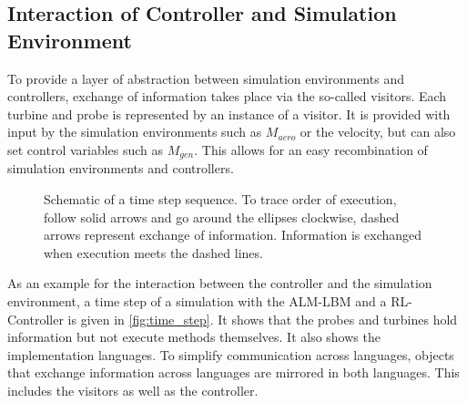 \subsection{Interaction of Controller and Simulation Environment}
To provide a layer of abstraction between simulation environments and controllers, exchange of information takes place via the so-called visitors. Each turbine and probe is represented by an instance of a visitor. It is provided with input by the simulation environments such as $M_{aero}$ or the velocity, but can also set control variables such as $M_{gen}$. This allows for an easy recombination of simulation environments and controllers. \\
\begin{figure}[h]
	\centering
	\def\svgwidth{1 \textwidth}
	
	\caption{Schematic of a time step sequence. To trace order of execution, follow solid arrows and go around the ellipses clockwise, dashed arrows represent exchange of information. Information is exchanged when execution meets the dashed lines.}
	\label{fig:time_step}
\end{figure}
As an example for the interaction between the controller and the simulation environment, a time step of a simulation with the ALM-LBM and a RL-Controller is given in \autoref{fig:time_step}. It shows that the probes and turbines hold information but not execute methods themselves. It also shows the implementation languages. To simplify communication across languages, objects that exchange information across languages are mirrored in both languages. This includes the visitors as well as the controller.
